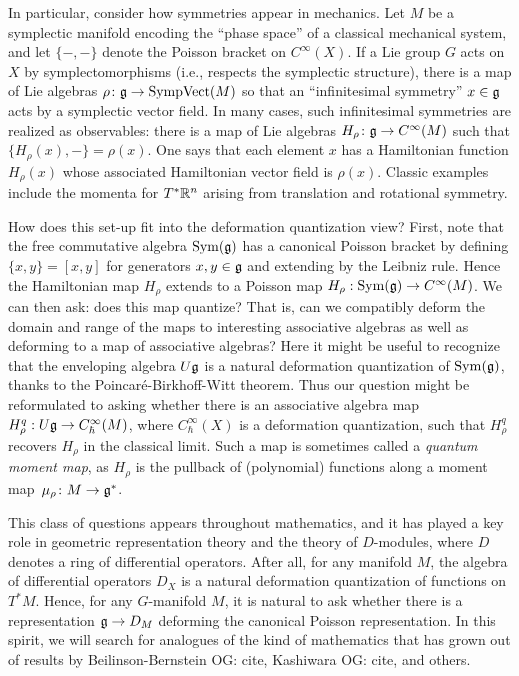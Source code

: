 \documentclass[11pt]{amsart}
\def\owen#1{{\textcolor{violet!50!black}{OG: {#1}}}}
\begin{document}
In particular, consider how symmetries appear in mechanics.
Let $M$ be a symplectic manifold encoding the ``phase space'' of a classical mechanical system,
and let $\{-,-\}$ denote the Poisson bracket on $C^\infty(X)$.
If a Lie group $G$ acts on $X$ by symplectomorphisms (i.e., respects the symplectic structure),
there is a map of Lie algebras $\rho \colon\mathfrak g \to {\rm SympVect}(M)$ so that an ``infinitesimal symmetry'' $x \in \mathfrak g$ acts by a symplectic vector field.
In many cases, such infinitesimal symmetries are realized as observables: 
there is a map of Lie algebras $H_\rho \colon \mathfrak g \to C^\infty(M)$ such that $\{ H_\rho(x), - \} = \rho(x)$.
One says that each element $x$ has a Hamiltonian function $H_\rho(x)$ whose associated Hamiltonian vector field is $\rho(x)$.
Classic examples include the momenta for $T^* \mathbb R^n$ arising from translation and rotational symmetry.

How does this set-up fit into the deformation quantization view?
First, note that the free commutative algebra $\operatorname{Sym}(\mathfrak g)$ has a canonical Poisson bracket by defining $ \{x, y \}   = [x, y]$ for generators $x, y \in \mathfrak g$ and extending by the Leibniz rule.
Hence the Hamiltonian map $H_\rho$ extends to a Poisson map $H_\rho: \operatorname{Sym}(\mathfrak g) \to C^\infty(M)$.
We can then ask: does this map quantize? That is, can we compatibly deform the domain and range of the maps to interesting associative algebras as well as deforming to a map of associative algebras?
Here it might be useful to recognize that the enveloping algebra $U\mathfrak g$ is a natural deformation quantization of $\operatorname{Sym}(\mathfrak g)$, thanks to the Poincar\'e-Birkhoff-Witt theorem.
Thus our question might be reformulated to asking whether there is an associative algebra map $H^q_\rho: U\mathfrak g \to C_\hbar^\infty(M)$, where $C_\hbar^\infty(X)$ is a deformation quantization, such that $H^q_\rho$ recovers $H_\rho$ in the classical limit.
Such a map is sometimes called a {\em quantum moment map},
as $H_\rho$ is the pullback of (polynomial) functions along a moment map~$\mu_\rho \colon M \to \mathfrak g^*$.

This class of questions appears throughout mathematics,
and it has played a key role in geometric representation theory and the theory of $D$-modules, where $D$ denotes a ring of differential operators.
After all, for any manifold $M$, the algebra of differential operators $D_X$ is a natural deformation quantization of functions on $T^* M$.
Hence, for any $G$-manifold $M$, it is natural to ask whether there is a representation $\mathfrak g \to D_M$ deforming the canonical Poisson representation.
In this spirit, we will search for analogues of the kind of mathematics that has grown out of results by Beilinson-Bernstein \owen{cite}, Kashiwara \owen{cite}, and others.
\end{document}
